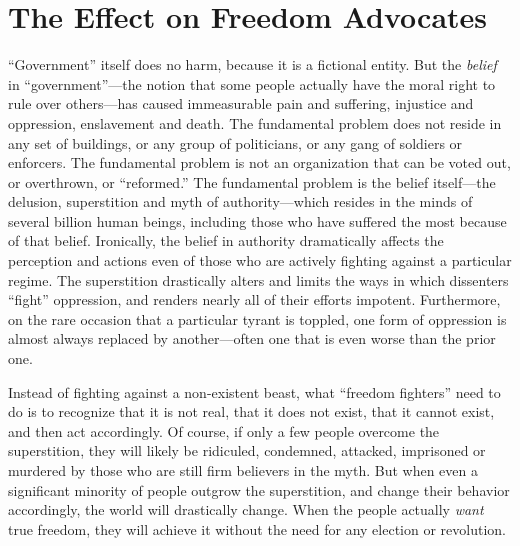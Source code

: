 \documentclass{book}
\begin{document}
\section{The Effect on Freedom Advocates}

\enquote{Government} itself does no harm, because it is a fictional entity. But the \emph{belief} in \enquote{government}---the notion that some people actually have the moral right to rule over others---has caused immeasurable pain and suffering, injustice and oppression, enslavement and death. The fundamental problem does not reside in any set of buildings, or any group of politicians, or any gang of soldiers or enforcers. The fundamental problem is not an organization that can be voted out, or overthrown, or \enquote{reformed.} The fundamental problem is the belief itself---the delusion, superstition and myth of authority---which resides in the minds of several billion human beings, including those who have suffered the most because of that belief. Ironically, the belief in authority dramatically affects the perception and actions even of those who are actively fighting against a particular regime. The superstition drastically alters and limits the ways in which dissenters \enquote{fight} oppression, and renders nearly all of their efforts impotent. Furthermore, on the rare occasion that a particular tyrant is toppled, one form of oppression is almost always replaced by another---often one that is even worse than the prior one.

Instead of fighting against a non-existent beast, what \enquote{freedom fighters} need to do is to recognize that it is not real, that it does not exist, that it cannot exist, and then act accordingly. Of course, if only a few people overcome the superstition, they will likely be ridiculed, condemned, attacked, imprisoned or murdered by those who are still firm believers in the myth. But when even a significant minority of people outgrow the superstition, and change their behavior accordingly, the world will drastically change. When the people actually \emph{want} true freedom, they will achieve it without the need for any election or revolution.
\end{document}
